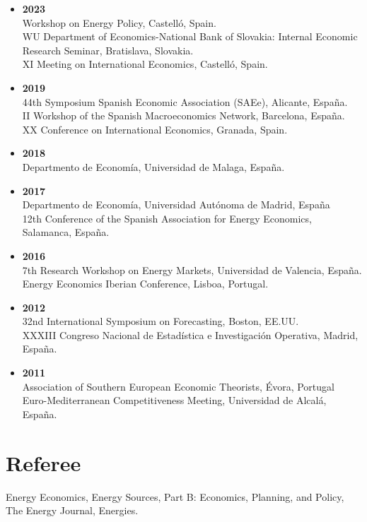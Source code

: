 \documentclass[11pt]{article}\usepackage[]{graphicx}\usepackage[usenames,dvipsnames]{xcolor}
\begin{document}
\begin{itemize}
 \item \textbf{2023}\\
  Workshop on Energy Policy, Castelló, Spain.\\
  WU Department of Economics-National Bank of Slovakia: Internal Economic Research Seminar, Bratislava, Slovakia.\\
  XI Meeting on International Economics, Castelló, Spain.
  \item \textbf{2019}\\
  44th Symposium Spanish Economic Association (SAEe), Alicante, España.\\
  II Workshop of the Spanish Macroeconomics Network, Barcelona, España.\\
  XX Conference on International Economics, Granada, Spain.
  \item \textbf{2018}\\
  Departmento de Economía, Universidad de Malaga, España.
    \item \textbf{2017}\\
  Departmento de Economía, Universidad Autónoma de Madrid, España\\
  12th Conference of the Spanish Association for Energy Economics, Salamanca, España.
  \item \textbf{2016}\\
  7th Research Workshop on Energy Markets, Universidad de Valencia, España.\\
  Energy Economics Iberian Conference, Lisboa, Portugal.
  \item \textbf{2012}\\
  32nd International Symposium on Forecasting, Boston, EE.UU.\\
  XXXIII Congreso Nacional de Estadística e Investigación Operativa, Madrid, España.
  \item \textbf{2011}\\
  Association of Southern European Economic Theorists, Évora, Portugal\\
  Euro-Mediterranean Competitiveness Meeting, Universidad de Alcalá, España.
\end{itemize}

\section{Referee} 

\raggedright
Energy Economics, Energy Sources, Part B: Economics, Planning, and Policy, The Energy Journal,  Energies.
\end{document}
